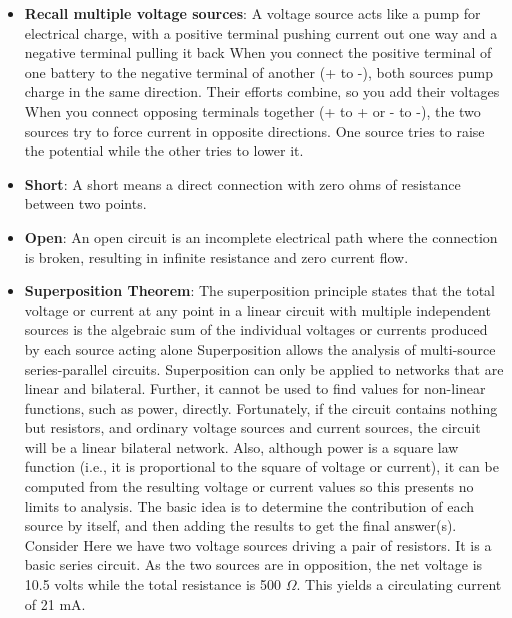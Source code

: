 \documentclass{report}
\begin{document}
\begin{itemize}
        \item \textbf{Recall multiple voltage sources}: A voltage source acts like a pump for electrical charge, with a positive terminal pushing current out one way and a negative terminal pulling it back
            \bigbreak \noindent 
            When you connect the positive terminal of one battery to the negative terminal of another (+ to -), both sources pump charge in the same direction. Their efforts combine, so you add their voltages
            \bigbreak \noindent 
            When you connect opposing terminals together (+ to + or - to -), the two sources try to force current in opposite directions. One source tries to raise the potential while the other tries to lower it.
        \item \textbf{Short}: A short means a direct connection with zero ohms of resistance between two points.
        \item \textbf{Open}: An open circuit is an incomplete electrical path where the connection is broken, resulting in infinite resistance and zero current flow.
        \item \textbf{Superposition Theorem}: The superposition principle states that the total voltage or current at any point in a linear circuit with multiple independent sources is the algebraic sum of the individual voltages or currents produced by each source acting alone
            \bigbreak \noindent 
            Superposition allows the analysis of multi-source series-parallel circuits. Superposition can only be applied to networks that are linear and bilateral. Further, it cannot be used to find values for non-linear functions, such as power, directly. Fortunately, if the circuit contains nothing but resistors, and ordinary voltage sources and current sources, the circuit will be a linear bilateral network. Also, although power is a square law function (i.e., it is proportional to the square of voltage or current), it can be computed from the resulting voltage or current values so this presents no limits to analysis.
            \bigbreak \noindent 
            The basic idea is to determine the contribution of each source by itself, and then adding the results to get the final answer(s). Consider
            \bigbreak \noindent 
            Here we have two voltage sources driving a pair of resistors. It is a basic series circuit. As the two sources are in opposition, the net voltage is 10.5 volts while the total resistance is 500 $\Omega$. This yields a circulating current of 21 mA. 
            \bigbreak \noindent 

\end{itemize}
\end{document}

